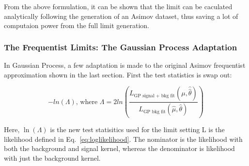 %
%


%


From the above formulation, it can be shown that the limit can be caculated analytically following the generation of an Asimov dataset, thus saving a lot of computaion power from the full limit generation. 

\subsubsection{The Frequentist Limits: The Gaussian Process Adaptation}

In Gaussian Process, a few adaptation is made to the original Asimov frequentist approximation shown in the last section. First the test statistics is swap out:

\begin{equation}
    -ln(\Lambda) \textrm{, where }\Lambda= 2ln(\frac{L_{\textrm{GP signal + bkg fit}}(\mu, \hat{\hat{\theta}})}{L_{\textrm{GP bkg fit}}(\hat{\mu}, \hat{\theta})})
\end{equation}

Here, $\ln(\Lambda)$ is the new test statisitics used for the limit setting L is the likelihood defined in Eq.~\ref{eq:loglikelihood}. The nominator is the likelihood with both the background and signal kernel, whereas the denominator is likelihood with just the background kernel. 

